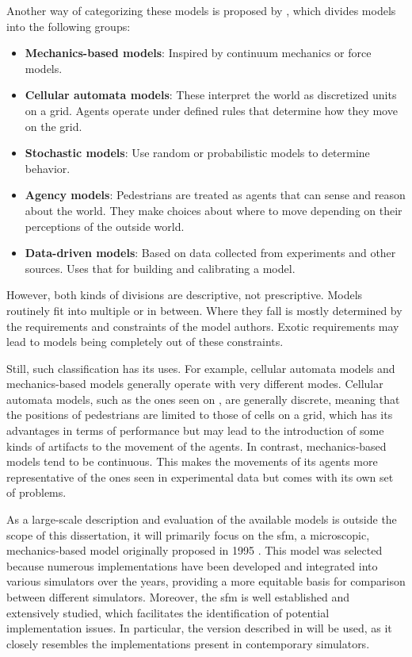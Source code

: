\documentclass[twoside, 11pt]{article}
\begin{document}
Another way of categorizing these models is proposed by \cite{martinez-gilModelingEvaluationScale2017}, which divides models into the following groups:

\begin{itemize}
  \item \textbf{Mechanics-based models}: Inspired by continuum mechanics or force models.
  \item \textbf{Cellular automata models}: These interpret the world as discretized units on a grid. Agents operate under defined rules that determine how they move on the grid.
  \item \textbf{Stochastic models}: Use random or probabilistic models to determine behavior.
  \item \textbf{Agency models}: Pedestrians are treated as agents that can sense and reason about the world. They make choices about where to move depending on their perceptions of the outside world.
  \item \textbf{Data-driven models}: Based on data collected from experiments and other sources. Uses that for building and calibrating a model.
\end{itemize}

However, both kinds of divisions are descriptive, not prescriptive. Models routinely fit into multiple or in between. Where they fall is mostly determined by the requirements and constraints of the model authors. Exotic requirements may lead to models being completely out of these constraints.

Still, such classification has its uses. For example, cellular automata models and mechanics-based models generally operate with very different modes. Cellular automata models, such as the ones seen on \cite{HUANG2017417}, are generally discrete, meaning that the positions of pedestrians are limited to those of cells on a grid, which has its advantages in terms of performance but may lead to the introduction of some kinds of artifacts to the movement of the agents. In contrast, mechanics-based models tend to be continuous. This makes the movements of its agents more representative of the ones seen in experimental data but comes with its own set of problems.

As a large-scale description and evaluation of the available models is outside the scope of this dissertation, it will primarily focus on the \gls{sfm}, a microscopic, mechanics-based model originally proposed in 1995 \cite{helbingSocialForceModel1995}. This model was selected because numerous implementations have been developed and integrated into various simulators over the years, providing a more equitable basis for comparison between different simulators. Moreover, the \gls{sfm} is well established and extensively studied, which facilitates the identification of potential implementation issues. In particular, the version described in \cite{helbingSimulatingDynamicFeatures2000} will be used, as it closely resembles the implementations present in contemporary simulators.
\end{document}
